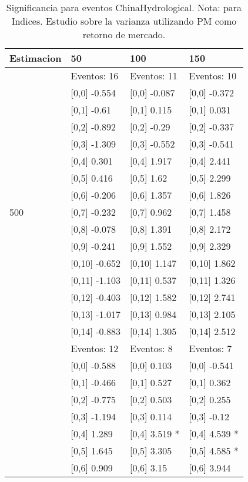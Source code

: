 \begin{table}

\caption{Significancia para eventos ChinaHydrological. Nota: para Indices. Estudio sobre la varianza utilizando PM como retorno de mercado.}
\centering
\begin{tabular}[t]{llll}
\toprule
Estimacion & 50 & 100 & 150\\
\midrule
 & Eventos:  16 & Eventos:  11 & Eventos:  10\\
 & {}[0,0] -0.554 & {}[0,0] -0.087 & {}[0,0] -0.372\\
 & {}[0,1] -0.61 & {}[0,1] 0.115 & {}[0,1] 0.031\\
 & {}[0,2] -0.892 & {}[0,2] -0.29 & {}[0,2] -0.337\\
 & {}[0,3] -1.309 & {}[0,3] -0.552 & {}[0,3] -0.541\\
\addlinespace
 & {}[0,4] 0.301 & {}[0,4] 1.917 & {}[0,4] 2.441\\
 & {}[0,5] 0.416 & {}[0,5] 1.62 & {}[0,5] 2.299\\
 & {}[0,6] -0.206 & {}[0,6] 1.357 & {}[0,6] 1.826\\
500 & {}[0,7] -0.232 & {}[0,7] 0.962 & {}[0,7] 1.458\\
 & {}[0,8] -0.078 & {}[0,8] 1.391 & {}[0,8] 2.172\\
\addlinespace
 & {}[0,9] -0.241 & {}[0,9] 1.552 & {}[0,9] 2.329\\
 & {}[0,10] -0.652 & {}[0,10] 1.147 & {}[0,10] 1.862\\
 & {}[0,11] -1.103 & {}[0,11] 0.537 & {}[0,11] 1.326\\
 & {}[0,12] -0.403 & {}[0,12] 1.582 & {}[0,12] 2.741\\
 & {}[0,13] -1.017 & {}[0,13] 0.984 & {}[0,13] 2.105\\
\addlinespace
 & {}[0,14] -0.883 & {}[0,14] 1.305 & {}[0,14] 2.512\\
 & Eventos:  12 & Eventos:  8 & Eventos:  7\\
 & {}[0,0] -0.588 & {}[0,0] 0.103 & {}[0,0] -0.541\\
 & {}[0,1] -0.466 & {}[0,1] 0.527 & {}[0,1] 0.362\\
 & {}[0,2] -0.775 & {}[0,2] 0.503 & {}[0,2] 0.255\\
\addlinespace
 & {}[0,3] -1.194 & {}[0,3] 0.114 & {}[0,3] -0.12\\
 & {}[0,4] 1.289 & {}[0,4] 3.519 * & {}[0,4] 4.539 *\\
 & {}[0,5] 1.645 & {}[0,5] 3.305 & {}[0,5] 4.585 *\\
 & {}[0,6] 0.909 & {}[0,6] 3.15 & {}[0,6] 3.944\\

\end{tabular}
\end{table}
